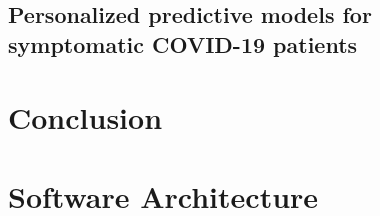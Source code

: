 \documentclass[11pt,a4paper]{article}
\begin{document}
\subsection{Personalized predictive models for symptomatic COVID-19 patients}

\section{Conclusion}

\section{Software Architecture}

\printbibliography
\end{document}
